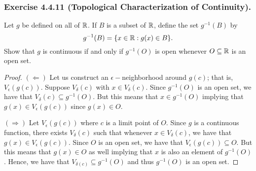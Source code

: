 \subsubsection{Exercise 4.4.11 (Topological Characterization of Continuity).} Let \( g  \) be defined on all of \( \mathbb{R}  \). If \( B  \) is a subset of \( \mathbb{R}  \), define the set \( g^{-1}(B)  \) by 
\[  g^{-1}(B) = \{ x \in \mathbb{R} : g(x) \in B  \}. \]
Show that \( g  \) is continuous if and only if \( g^{-1}(O)  \) is open whenever \( O \subseteq \mathbb{R}  \) is an open set.
\begin{proof}
    \( (\Leftarrow) \) Let us construct an \( \epsilon - \)neighborhood around \( g(c) \); that is, \( V_{\epsilon }(g(c)) \). Suppose \( V_{\delta}(c) \) with \( x \in V_{\delta}(c) \). Since \( g^{-1}(O) \) is an open set, we have that \( V_{\delta}(c) \subseteq g^{-1}(O) \). But this means that \( x \in g^{-1}(O) \) implying that \( g(x) \in V_{\epsilon }(g(c))  \) since \( g(x) \in O  \).


    \( (\Rightarrow) \) Let \( V_{\epsilon }(g(c))  \) where \( c  \) is a limit point of \( O  \). Since \( g \) is a continuous function, there exists \( V_{\delta}(c)  \) such that whenever \( x \in V_{\delta}(c)  \), we have that \( g(x) \in V_{\epsilon}(g(c)) \). Since \( O  \) is an open set, we have that \( V_{\epsilon}(g(c)) \subseteq O  \). But this means that \( g(x) \in O  \) as well implying that \( x  \) is also an element of \( g^{-1}(O) \). Hence, we have that \( V_{\delta (c) }  \subseteq g^{-1}(O)\) and thus \( g^{-1}(O)  \) is an open set.
\end{proof}


